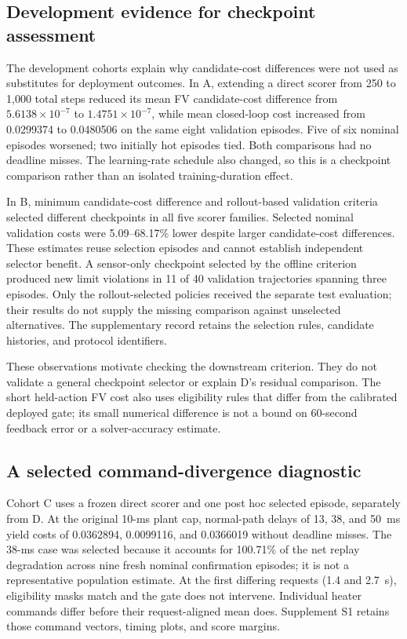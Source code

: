 \subsection{Development evidence for checkpoint assessment}

The development cohorts explain why candidate-cost differences were not used as substitutes for deployment outcomes. In A, extending a direct scorer from 250 to 1,000 total steps reduced its mean FV candidate-cost difference from $5.6138\times10^{-7}$ to $1.4751\times10^{-7}$, while mean closed-loop cost increased from 0.0299374 to 0.0480506 on the same eight validation episodes. Five of six nominal episodes worsened; two initially hot episodes tied. Both comparisons had no deadline misses. The learning-rate schedule also changed, so this is a checkpoint comparison rather than an isolated training-duration effect.

In B, minimum candidate-cost difference and rollout-based validation criteria selected different checkpoints in all five scorer families. Selected nominal validation costs were 5.09--68.17\% lower despite larger candidate-cost differences. These estimates reuse selection episodes and cannot establish independent selector benefit. A sensor-only checkpoint selected by the offline criterion produced new limit violations in 11 of 40 validation trajectories spanning three episodes. Only the rollout-selected policies received the separate test evaluation; their results do not supply the missing comparison against unselected alternatives. The supplementary record retains the selection rules, candidate histories, and protocol identifiers.

These observations motivate checking the downstream criterion. They do not validate a general checkpoint selector or explain D's residual comparison. The short held-action FV cost also uses eligibility rules that differ from the calibrated deployed gate; its small numerical difference is not a bound on 60-second feedback error or a solver-accuracy estimate.

\subsection{A selected command-divergence diagnostic}

Cohort C uses a frozen direct scorer and one post hoc selected episode, separately from D. At the original 10-ms plant cap, normal-path delays of 13, 38, and 50~ms yield costs of 0.0362894, 0.0099116, and 0.0366019 without deadline misses. The 38-ms case was selected because it accounts for 100.71\% of the net replay degradation across nine fresh nominal confirmation episodes; it is not a representative population estimate. At the first differing requests (1.4 and 2.7~s), eligibility masks match and the gate does not intervene. Individual heater commands differ before their request-aligned mean does. Supplement S1 retains those command vectors, timing plots, and score margins.

